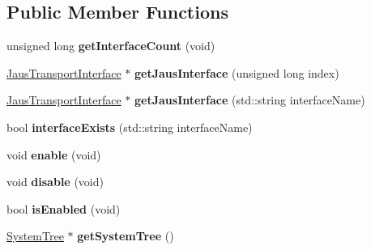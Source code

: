 \subsection*{\-Public \-Member \-Functions}
\begin{DoxyCompactItemize}
\item 
\hypertarget{class_jaus_communication_manager_a750537971ebe3316a61cb7dc8239083e}{unsigned long {\bfseries get\-Interface\-Count} (void)}\label{class_jaus_communication_manager_a750537971ebe3316a61cb7dc8239083e}

\item 
\hypertarget{class_jaus_communication_manager_a02b741aff1e1a6b92716d139876b94a9}{\hyperlink{class_jaus_transport_interface}{\-Jaus\-Transport\-Interface} $\ast$ {\bfseries get\-Jaus\-Interface} (unsigned long index)}\label{class_jaus_communication_manager_a02b741aff1e1a6b92716d139876b94a9}

\item 
\hypertarget{class_jaus_communication_manager_a412d3227d7552338709b692e0dc70adb}{\hyperlink{class_jaus_transport_interface}{\-Jaus\-Transport\-Interface} $\ast$ {\bfseries get\-Jaus\-Interface} (std\-::string interface\-Name)}\label{class_jaus_communication_manager_a412d3227d7552338709b692e0dc70adb}

\item 
\hypertarget{class_jaus_communication_manager_a43d462e64c46b9ec6f2441bcc9155983}{bool {\bfseries interface\-Exists} (std\-::string interface\-Name)}\label{class_jaus_communication_manager_a43d462e64c46b9ec6f2441bcc9155983}

\item 
\hypertarget{class_jaus_communication_manager_a30adfb03e337ea191659f5ba23f1d24e}{void {\bfseries enable} (void)}\label{class_jaus_communication_manager_a30adfb03e337ea191659f5ba23f1d24e}

\item 
\hypertarget{class_jaus_communication_manager_a9ef92799117b806fbc464f8189b06bc2}{void {\bfseries disable} (void)}\label{class_jaus_communication_manager_a9ef92799117b806fbc464f8189b06bc2}

\item 
\hypertarget{class_jaus_communication_manager_ad0bb5c0576104da2e7caaee329349089}{bool {\bfseries is\-Enabled} (void)}\label{class_jaus_communication_manager_ad0bb5c0576104da2e7caaee329349089}

\item 
\hypertarget{class_jaus_communication_manager_aee646253cf73c77c8276be97e91cca41}{\hyperlink{class_system_tree}{\-System\-Tree} $\ast$ {\bfseries get\-System\-Tree} ()}\label{class_jaus_communication_manager_aee646253cf73c77c8276be97e91cca41}


\end{DoxyCompactItemize}

